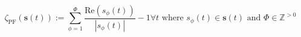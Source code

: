 \begin{equation}
	\zeta_\text{PF}(\textbf{s}(t)):= \sum_{\phi=1}^{\Phi}\frac{\text{Re}(s_\phi(t))}{|s_\phi(t)|} - 1 \forall t \text{ where } s_\phi(t) \in \textbf{s}(t) \text{ and } \Phi \in \mathbb{Z}^{>0}
\label{ch1:equ:power-factor}
\end{equation}